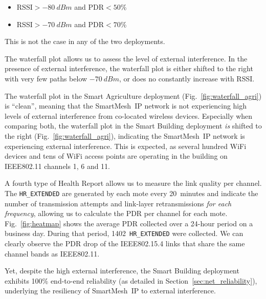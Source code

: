 \documentclass{elsarticle}
\newcommand{\smip}                {SmartMesh~IP\xspace}
\newcommand{\building}            {Smart Building\xspace}
\newcommand{\agri}                {Smart Agriculture\xspace}
\newcommand{\HREXTENDED}          {{\tt HR\_EXTENDED}\xspace}
\begin{document}
\begin{itemize}
    \item RSSI$>-80~dBm$ and PDR$<50$\%
    \item RSSI$>-70~dBm$ and PDR$<70$\%
\end{itemize}

This is not the case in any of the two deployments.


The waterfall plot allows us to assess the level of external interference.
In the presence of external interference, the waterfall plot is either shifted to the right with very few paths below $-70~dBm$, or does no constantly increase with RSSI.

The waterfall plot in the \agri deployment (Fig.~\ref{fig:waterfall_agri}) is ``clean'', meaning that the \smip network is not experiencing high levels of external interference from co-located wireless devices.
Especially when comparing both, the waterfall plot in the \building deployment \textit{is} shifted to the right (Fig.~\ref{fig:waterfall_agri}), indicating the \smip network is experiencing external interference.
This is expected, as several hundred WiFi devices and tens of WiFi access points are operating in the building on IEEE802.11 channels 1, 6 and 11.

A fourth type of Health Report allows us to measure the link quality per channel.
The \HREXTENDED are generated by each mote every 20~minutes and indicate the number of transmission attempts and link-layer retransmissions \textit{for each frequency}, allowing us to calculate the PDR per channel for each mote.
Fig.~\ref{fig:heatmap} shows the average PDR collected over a 24-hour period on a business day.
During that period, 1402~\HREXTENDED were collected.
We can clearly observe the PDR drop of the IEEE802.15.4 links that share the same channel bands as IEEE802.11.

Yet, despite the high external interference, the \building deployment exhibits 100\% end-to-end reliability (as detailed in Section~\ref{sec:net_reliability}), underlying the resiliency of \smip to external interference.
\end{document}
